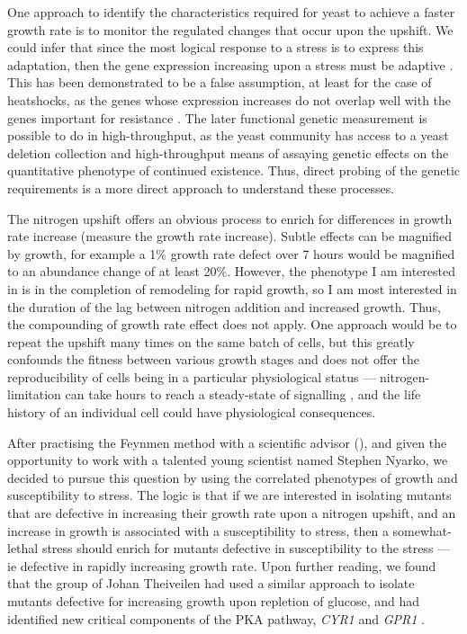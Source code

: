 One approach to identify the characteristics required for yeast to 
achieve a faster growth rate is to monitor the regulated changes that
occur upon the upshift. We could infer
that since the most logical response to a stress is to express this
adaptation, then the gene expression increasing upon a stress must be
adaptive \parencite{gould1979spandrels}. 
This has been demonstrated to be a false assumption, at least for the
case of heatshocks, as the genes whose expression increases do not 
overlap well with the
genes important for resistance \parencite{gibney2013yeast}.
The later functional genetic measurement is possible to do in 
high-throughput, as
the yeast community has access to a yeast deletion collection and
high-throughput means of assaying genetic effects on the quantitative
phenotype of continued existence. 
Thus, direct probing of the genetic requirements is a more direct
approach to understand these processes.

The nitrogen upshift offers an obvious process to enrich for
differences in growth rate increase (measure the growth rate
increase). Subtle effects can be magnified by growth, for example a
1\% growth rate defect over 7 hours would be magnified to an abundance
change of at least 20\%. However, the phenotype I am interested in is
in the completion of remodeling for rapid growth, so I am most
interested in the duration of the lag between nitrogen addition and
increased growth. Thus, the compounding of growth rate effect does not 
apply. One approach would be to repeat the upshift many times on the
same batch of cells, but this greatly confounds the fitness between 
various growth stages and does not offer the reproducibility of cells
being in a particular physiological status --- nitrogen-limitation can
take hours to reach a steady-state of signalling
\parencite{tate2013five}, and the life history of an individual cell
could have physiological consequences.

After practising the Feynmen method with a scientific advisor
(), and given
the opportunity to work with a talented young scientist named Stephen
Nyarko, we decided to pursue this question by using the correlated
phenotypes of growth and susceptibility to stress.
The logic is that if we are interested in isolating mutants that are
defective in increasing their growth rate upon a nitrogen upshift, and
an increase in growth is associated with a susceptibility to stress,
then a somewhat-lethal stress should enrich for mutants defective in
susceptibility to the stress --- ie defective in rapidly increasing 
growth rate.
Upon further reading, we found that the group of Johan Theiveilen had
used a similar approach to isolate mutants defective for increasing
growth upon repletion of glucose, and had identified new critical
components of the PKA pathway, \textit{CYR1} and \textit{GPR1}
\parencite{vandjick2000}.

